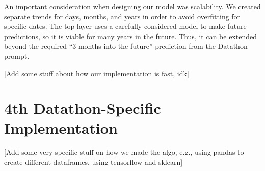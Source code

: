 \documentclass{article}
\begin{document}
An important consideration when designing our model was scalability. We created separate trends for days, months, and years in order to avoid overfitting for specific dates. The top layer uses a carefully considered model to make future predictions, so it is viable for many years in the future. Thus, it can be extended beyond the required ``3 months into the future'' prediction from the Datathon prompt. \bigskip

[Add some stuff about how our implementation is fast, idk]

\section{4th Datathon-Specific Implementation}

[Add some very specific stuff on how we made the algo, e.g., using pandas to create different dataframes, using tensorflow and sklearn]
\end{document}
